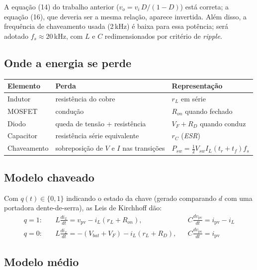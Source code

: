 \documentclass[11pt,a4paper]{article}
\newcommand{\vpv}{v_{\mathrm{pv}}}
\newcommand{\ipv}{i_{\mathrm{pv}}}
\begin{document}
\begin{atencao}
A equação (14) do trabalho anterior ($v_o=v_i\,D/(1-D)$) está correta; a equação (16), que
deveria ser a mesma relação, aparece invertida. Além disso, a frequência de chaveamento
usada (2\,kHz) é baixa para essa potência; será adotado $f_s\approx20$\,kHz, com $L$ e $C$
redimensionados por critério de \emph{ripple}.
\end{atencao}

\subsection{Onde a energia se perde}

\begin{center}\small
\begin{tabular}{lll}
\toprule
Elemento & Perda & Representação \\
\midrule
Indutor & resistência do cobre & $r_L$ em série \\
MOSFET & condução & $R_{on}$ quando fechado \\
Diodo & queda de tensão + resistência & $V_F + R_D$ quando conduz \\
Capacitor & resistência série equivalente & $r_C$ (\emph{ESR}) \\
Chaveamento & sobreposição de $V$ e $I$ nas transições & $P_{sw}=\tfrac12 V_{sw}I_L(t_r+t_f)f_s$ \\
\bottomrule
\end{tabular}
\end{center}

\subsection{Modelo chaveado}

Com $q(t)\in\{0,1\}$ indicando o estado da chave (gerado comparando $d$ com uma portadora
dente-de-serra), as Leis de Kirchhoff dão:
\begin{align}
q=1:\quad & L\frac{di_L}{dt} = \vpv - i_L(r_L+R_{on}), &
            & C\frac{d\vpv}{dt} = \ipv - i_L\\
q=0:\quad & L\frac{di_L}{dt} = -(V_{bat}+V_F) - i_L(r_L+R_D), &
            & C\frac{d\vpv}{dt} = \ipv
\end{align}

\subsection{Modelo médio}
\end{document}
